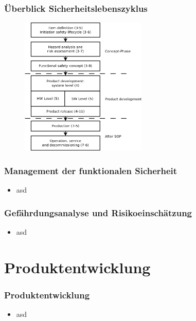 \documentclass[]{beamer}
\begin{document}
\begin{frame}
\frametitle{Überblick Sicherheitslebenszyklus}
\begin{figure}
   \includegraphics[width=6cm]{Abb_6_1}
\end{figure}
\end{frame}


\begin{frame}
\frametitle{Management der funktionalen Sicherheit}

\begin{itemize}
    \item asd
\end{itemize}

\end{frame}

\begin{frame}
\frametitle{Gefährdungsanalyse und Risikoeinschätzung}

\begin{itemize}
    \item asd
\end{itemize}

\end{frame}



\section{Produktentwicklung}
\label{sec:Produktentwicklung}

\begin{frame}
\frametitle{Produktentwicklung}

\begin{itemize}
    \item asd
\end{itemize}

\end{frame}
\end{document}
